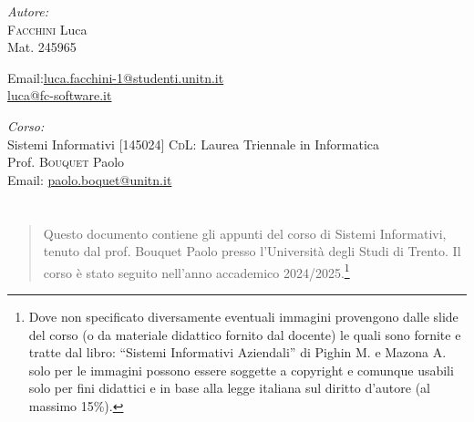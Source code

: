 \documentclass[twoside,a4paper]{report}
\makeatletter
\renewenvironment{abstract}{%
    \if@twocolumn
        \section*{\abstractname}%
    \else
        \begin{center}%
            {\bfseries \abstractname\vspace{-.5em}\vspace{\z@}}%
        \end{center}%
        \small
        \begin{quotation}
    \fi}
    {\if@twocolumn\else\end{quotation}\fi}
\makeatother
\begin{document}
\begin{titlepage}
        \begin{minipage}[t]{0.4\textwidth}
            \begin{flushleft} \normalsize
                \emph{Autore:}\\
                \textsc{Facchini} Luca \\ %
                Mat. 245965 \\
                \vspace{-\baselineskip}
                \begin{tabbing}
                    Email:\= \href{mailto:luca.facchini-1@studenti.unitn.it}{luca.facchini-1@studenti.unitn.it} \\
                        \>  \href{mailto:luca@fc-software.it}{luca@fc-software.it}
                \end{tabbing}
            \end{flushleft}
        \end{minipage}
        \hfill
        \begin{minipage}[t]{0.4\textwidth}
            \begin{flushleft} \normalsize
                \emph{Corso:}\\
                Sistemi Informativi [145024]
                \textsc{CdL}: Laurea Triennale in Informatica \\
                Prof. \textsc{Bouquet} Paolo \\
                Email: \href{mailto:paolo.boquet@unitn.it}{paolo.boquet@unitn.it}
            \end{flushleft}
        \end{minipage}
        \vfill
        \begin{abstract}
            Questo documento contiene gli appunti del corso di Sistemi Informativi, tenuto dal prof. Bouquet Paolo presso l'Università degli Studi di Trento. Il corso è stato seguito nell'anno accademico 2024/2025.\footnote{Dove non specificato diversamente eventuali immagini provengono dalle slide del corso (o da materiale didattico fornito dal docente) le quali sono fornite e tratte dal libro: ``Sistemi Informativi Aziendali'' di Pighin M. e Mazona A. solo per le immagini possono essere soggette a copyright e comunque usabili solo per fini didattici e in base alla legge italiana sul diritto d'autore (al massimo 15\%).}
        \end{abstract}

    \end{titlepage}
\end{document}
